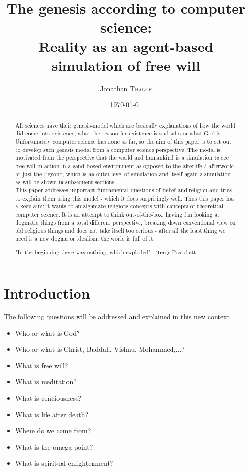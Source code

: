 \documentclass{article}
\title{The genesis according to computer science:\\Reality as an agent-based simulation of free will} %
\author{Jonathan \textsc{Thaler}} %
\date{\today} %
\begin{document}
\maketitle %

\begin{abstract}
All sciences have their genesis-model which are basically explanations of how the world did come into existence, what the reason for existence is and who or what God is. Unfortunately computer science has none so far, so the aim of this paper is to set out to develop such genesis-model from a computer-science perspective. The model is motivated from the perspective that the world and humankind is a simulation to see free will in action in a sand-boxed environment as opposed to the afterlife / afterworld or just the Beyond, which is an outer level of simulation and itself again a simulation as will be shown in subsequent sections. \\
This paper addresses important fundamental questions of belief and religion and tries to explain them using this model - which it does surprisingly well. Thus this paper has a keen aim: it wants to amalgamate religious concepts with concepts of theoretical computer science. It is an attempt to think out-of-the-box, having fun looking at dogmatic things from a total different perspective, breaking down conventional view on old religious things and does not take itself too serious - after all the least thing we need is a new dogma or idealism, the world is full of it.

\bigskip

"In the beginning there was nothing, which exploded" - Terry Pratchett
\end{abstract}

\section{Introduction}

The following questions will be addressed and explained in this new context

\begin{itemize}
\item Who or what is God?
\item Who or what is Christ, Buddah, Vishnu, Mohammed,...?
\item What is free will? 
\item What is meditation?
\item What is conciousness?
\item What is life after death?
\item Where do we come from?
\item What is the omega point?
\item What is spiritual enlightenment?
\end{itemize}
\end{document}
